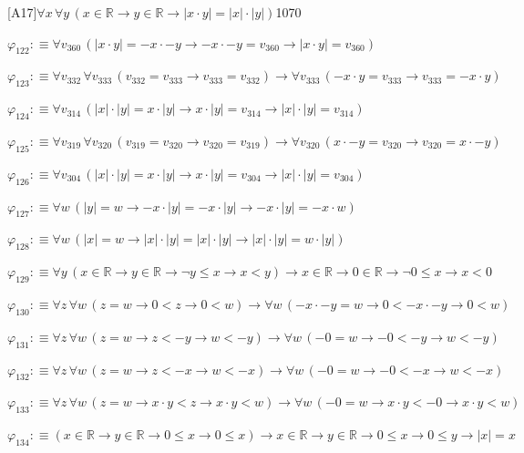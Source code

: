 \begin{fullproof}{[A17]}{$\forall x\,\forall y\,(x \in \mathbb{R} \to y \in \mathbb{R} \to \lvert x \cdot y \rvert = \lvert x \rvert \cdot \lvert y \rvert)$}{1070}
\begin{abbrevlist}
\item $\varphi_{122} :\equiv \forall v_{360}\,(\lvert x \cdot y \rvert = -x \cdot -y \to -x \cdot -y = v_{360} \to \lvert x \cdot y \rvert = v_{360})$
\item $\varphi_{123} :\equiv \forall v_{332}\,\forall v_{333}\,(v_{332} = v_{333} \to v_{333} = v_{332}) \to \forall v_{333}\,(-x \cdot y = v_{333} \to v_{333} = -x \cdot y)$
\item $\varphi_{124} :\equiv \forall v_{314}\,(\lvert x \rvert \cdot \lvert y \rvert = x \cdot \lvert y \rvert \to x \cdot \lvert y \rvert = v_{314} \to \lvert x \rvert \cdot \lvert y \rvert = v_{314})$
\item $\varphi_{125} :\equiv \forall v_{319}\,\forall v_{320}\,(v_{319} = v_{320} \to v_{320} = v_{319}) \to \forall v_{320}\,(x \cdot -y = v_{320} \to v_{320} = x \cdot -y)$
\item $\varphi_{126} :\equiv \forall v_{304}\,(\lvert x \rvert \cdot \lvert y \rvert = x \cdot \lvert y \rvert \to x \cdot \lvert y \rvert = v_{304} \to \lvert x \rvert \cdot \lvert y \rvert = v_{304})$
\item $\varphi_{127} :\equiv \forall w\,(\lvert y \rvert = w \to -x \cdot \lvert y \rvert = -x \cdot \lvert y \rvert \to -x \cdot \lvert y \rvert = -x \cdot w)$
\item $\varphi_{128} :\equiv \forall w\,(\lvert x \rvert = w \to \lvert x \rvert \cdot \lvert y \rvert = \lvert x \rvert \cdot \lvert y \rvert \to \lvert x \rvert \cdot \lvert y \rvert = w \cdot \lvert y \rvert)$
\item $\varphi_{129} :\equiv \forall y\,(x \in \mathbb{R} \to y \in \mathbb{R} \to \neg y \leq x \to x < y) \to x \in \mathbb{R} \to 0 \in \mathbb{R} \to \neg 0 \leq x \to x < 0$
\item $\varphi_{130} :\equiv \forall z\,\forall w\,(z = w \to 0 < z \to 0 < w) \to \forall w\,(-x \cdot -y = w \to 0 < -x \cdot -y \to 0 < w)$
\item $\varphi_{131} :\equiv \forall z\,\forall w\,(z = w \to z < -y \to w < -y) \to \forall w\,(-0 = w \to -0 < -y \to w < -y)$
\item $\varphi_{132} :\equiv \forall z\,\forall w\,(z = w \to z < -x \to w < -x) \to \forall w\,(-0 = w \to -0 < -x \to w < -x)$
\item $\varphi_{133} :\equiv \forall z\,\forall w\,(z = w \to x \cdot y < z \to x \cdot y < w) \to \forall w\,(-0 = w \to x \cdot y < -0 \to x \cdot y < w)$
\item $\varphi_{134} :\equiv (x \in \mathbb{R} \to y \in \mathbb{R} \to 0 \leq x \to 0 \leq x) \to x \in \mathbb{R} \to y \in \mathbb{R} \to 0 \leq x \to 0 \leq y \to \lvert x \rvert = x$

\end{abbrevlist}
\end{fullproof}

